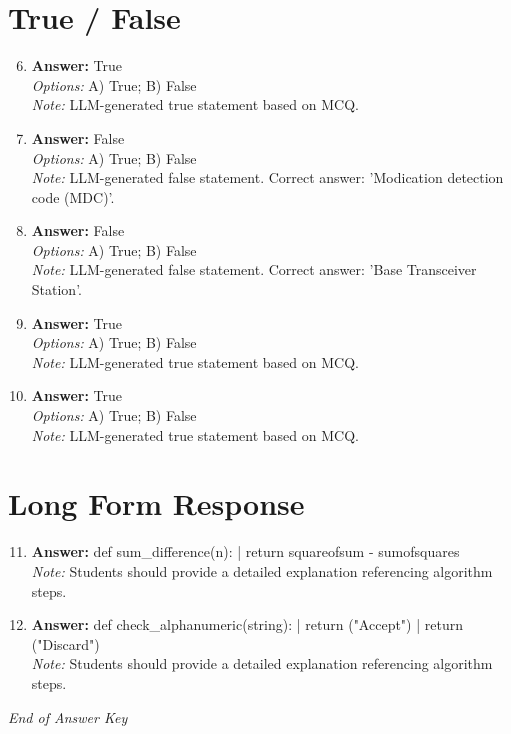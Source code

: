 \documentclass[12pt]{article}
\begin{document}
\section*{True / False}
\begin{enumerate}[label=\arabic*.]
\setcounter{enumi}{5}
\item \textbf{Answer:} True
\\ \textit{Options:} A) True; B) False
\\ \textit{Note:} LLM-generated true statement based on MCQ.
\item \textbf{Answer:} False
\\ \textit{Options:} A) True; B) False
\\ \textit{Note:} LLM-generated false statement. Correct answer: 'Modication detection code (MDC)'.
\item \textbf{Answer:} False
\\ \textit{Options:} A) True; B) False
\\ \textit{Note:} LLM-generated false statement. Correct answer: 'Base Transceiver Station'.
\item \textbf{Answer:} True
\\ \textit{Options:} A) True; B) False
\\ \textit{Note:} LLM-generated true statement based on MCQ.
\item \textbf{Answer:} True
\\ \textit{Options:} A) True; B) False
\\ \textit{Note:} LLM-generated true statement based on MCQ.
\end{enumerate}

\section*{Long Form Response}
\begin{enumerate}[label=\arabic*.]
\setcounter{enumi}{10}
\item \textbf{Answer:} def sum\_difference(n): | return squareofsum - sumofsquares
\\ \textit{Note:} Students should provide a detailed explanation referencing algorithm steps.
\item \textbf{Answer:} def check\_alphanumeric(string): | return ("Accept") | return ("Discard")
\\ \textit{Note:} Students should provide a detailed explanation referencing algorithm steps.
\end{enumerate}

\vfill
\noindent\textit{End of Answer Key}
\end{document}
